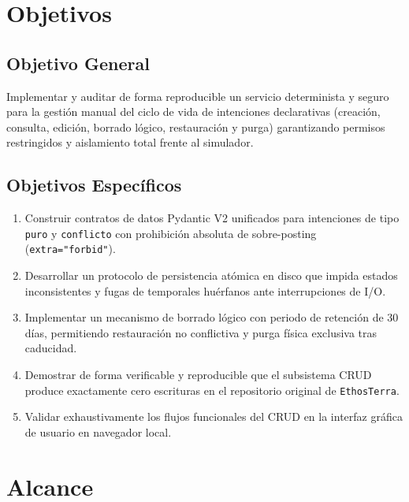 \documentclass[11pt,a4paper]{article}
\begin{document}
\section{Objetivos}

\subsection{Objetivo General}
Implementar y auditar de forma reproducible un servicio determinista y seguro para la gestión manual del ciclo de vida de intenciones declarativas (creación, consulta, edición, borrado lógico, restauración y purga) garantizando permisos restringidos y aislamiento total frente al simulador.

\subsection{Objetivos Específicos}
\begin{enumerate}[itemsep=2pt]
    \item Construir contratos de datos Pydantic V2 unificados para intenciones de tipo \texttt{puro} y \texttt{conflicto} con prohibición absoluta de sobre-posting (\texttt{extra="forbid"}).
    \item Desarrollar un protocolo de persistencia atómica en disco que impida estados inconsistentes y fugas de temporales huérfanos ante interrupciones de I/O.
    \item Implementar un mecanismo de borrado lógico con periodo de retención de 30 días, permitiendo restauración no conflictiva y purga física exclusiva tras caducidad.
    \item Demostrar de forma verificable y reproducible que el subsistema CRUD produce exactamente cero escrituras en el repositorio original de \texttt{EthosTerra}.
    \item Validar exhaustivamente los flujos funcionales del CRUD en la interfaz gráfica de usuario en navegador local.
\end{enumerate}

\section{Alcance}
\end{document}
